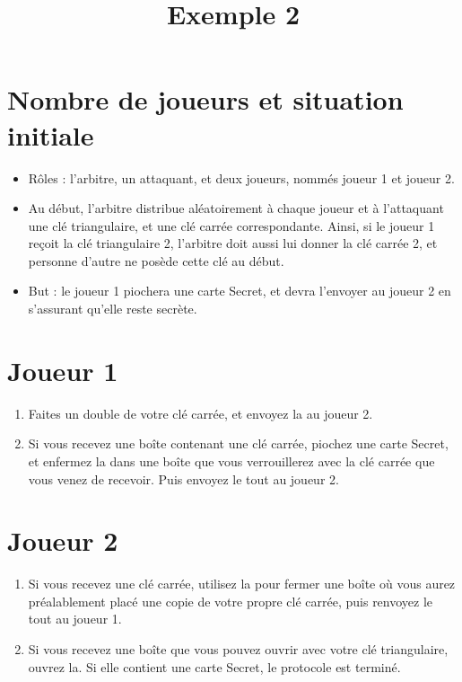 \documentclass[a4paper,10pt]{article}
\title{Exemple 2}
\begin{document}
\maketitle

\section{Nombre de joueurs et situation initiale}
\begin{itemize}
	\item Rôles : l'arbitre, un attaquant, et deux joueurs, nommés joueur 1 et joueur 2.
	\item Au début, l'arbitre distribue aléatoirement à chaque joueur et à l'attaquant une clé triangulaire, et une clé carrée correspondante. Ainsi, si le joueur 1 reçoit la clé triangulaire 2, l'arbitre doit aussi lui donner la clé carrée 2, et personne d'autre ne posède cette clé au début.
	\item But : le joueur 1 piochera une carte Secret, et devra l'envoyer au joueur 2 en s'assurant qu'elle reste secrète.
\end{itemize}




\section{Joueur 1}
\begin{enumerate}
	\item Faites un double de votre clé carrée, et envoyez la au joueur 2.
	\item Si vous recevez une boîte contenant une clé carrée, piochez une carte Secret, et enfermez la dans une boîte que vous verrouillerez avec la clé carrée que vous venez de recevoir. Puis envoyez le tout au joueur 2.
\end{enumerate}

\section{Joueur 2}
\begin{enumerate}
	\item Si vous recevez une clé carrée, utilisez la pour fermer une boîte où vous aurez préalablement placé une copie de votre propre clé carrée, puis renvoyez le tout au joueur 1.
	\item Si vous recevez une boîte que vous pouvez ouvrir avec votre clé triangulaire, ouvrez la. Si elle contient une carte Secret, le protocole est terminé.
\end{enumerate}
\end{document}
